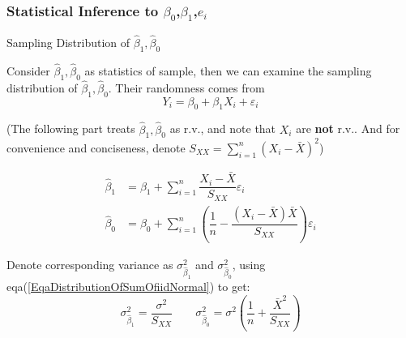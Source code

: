 




\subsubsection{Statistical Inference to $ \beta _0 $,$ \beta _1 $,$ e_i $}

\begin{point}
    Sampling Distribution of $ \hat{\beta} _1,\hat{\beta} _0  $
\end{point}

    Consider $ \hat{\beta} _1,\hat{\beta} _0 $ as statistics of sample, then we can examine the sampling distribution of $  \hat{\beta} _1,\hat{\beta} _0 $. Their randomness comes from
    \begin{equation}
        Y_i=\beta_0+\beta_1X_i+\varepsilon _i 
    \end{equation}
    
    

    (The following part treats $\hat{\beta} _1,\hat{\beta} _0 $ as r.v., and note that $ X_i $ are \textbf{not }r.v.. And  for convenience and conciseness, denote $ S_{XX}={\displaystyle\sum_{i=1}^n(X_i-\bar{X})^2} $)

   
\begin{align*}
        \hat{\beta }_1&=\beta _1+\sum_{i=1}^n\dfrac{X_i-\bar{X}}{S_{XX}}\varepsilon _i\\
        \hat{\beta }_0&=\beta _0+\sum_{i=1}^n\left(\dfrac{1}{n}-\dfrac{(X_i-\bar{X})\bar{X}}{S_{XX}}\right)\varepsilon _i
\end{align*}
 
    Denote corresponding variance as $ \sigma^2_{\hat{\beta}_1} $ and $ \sigma^2_{\hat{\beta}_0} $, using eqa(\ref{EqaDistributionOfSumOfiidNormal}) to get:
    \begin{equation}
        \sigma^2_{\hat{\beta}_1}= \dfrac{\sigma^2}{S_{XX}}\qquad \sigma^2_{\hat{\beta}_0}=\sigma^2(\dfrac{1}{n}+\dfrac{\bar{X}^2}{S_{XX}})
    \end{equation} 
    
